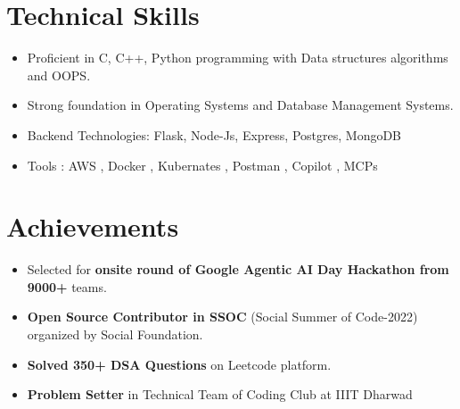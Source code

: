 \documentclass[letterpaper,11pt]{article}
\begin{document}
\section*{Technical Skills}
\begin{itemize}
    \setlength\itemsep{-0.3em} %
    
    \item Proficient in C, C++, Python programming with Data structures algorithms and OOPS.
    


     \item Strong foundation in Operating Systems and Database Management Systems.
    
    \item Backend Technologies: Flask, Node-Js, Express, Postgres, MongoDB

    \item Tools : AWS , Docker , Kubernates , Postman , Copilot , MCPs
    
\end{itemize}
\vspace{-10pt}

\section{Achievements}
    \begin{itemize}
    
    \setlength\itemsep{-0.3em} %

    \item Selected for \textbf{onsite round of Google Agentic AI Day Hackathon from 9000+} teams.

    \item \textbf{Open Source Contributor in SSOC }(Social Summer of Code-2022) organized by Social Foundation.

    \item\textbf{Solved 350+ DSA Questions} on Leetcode platform.

    \item \textbf{Problem Setter} in Technical Team of Coding Club at IIIT Dharwad
\end{itemize}
\end{document}

